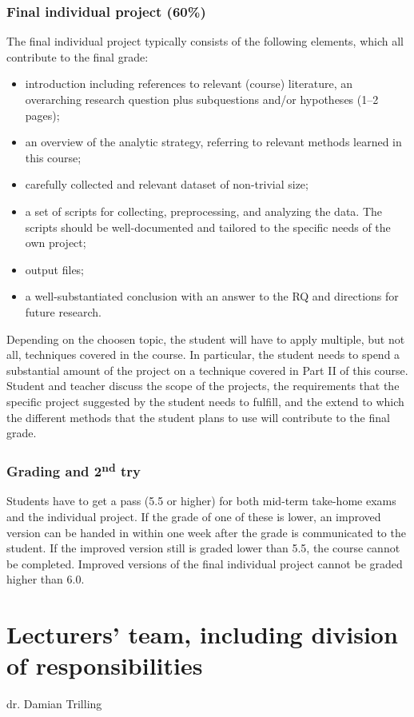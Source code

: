 \documentclass[a4paper,12pt]{report}
\begin{document}
\subsection*{Final individual project (60\%)}
The final individual project typically consists of the following elements, which all contribute to the final grade:
\begin{itemize}
\item introduction including references to relevant (course) literature, an overarching research question plus subquestions and/or hypotheses (1–2 pages);
\item an overview of the analytic strategy, referring to relevant methods learned in this course;
\item carefully collected and relevant dataset of non-trivial size;
\item a set of scripts for collecting, preprocessing, and analyzing the data. The scripts should be well-documented and tailored to the specific needs of the own project;
\item output files;
\item a well-substantiated conclusion with an answer to the RQ and directions for future research.
\end{itemize}

Depending on the choosen topic, the student will have to apply multiple, but not all, techniques covered in the course. In particular, the student needs to spend a substantial amount of the project on a technique covered in Part II of this course. Student and teacher discuss the scope of the projects, the requirements that the specific project suggested by the student needs to fulfill, and the extend to which the different methods that the student plans to use will contribute to the final grade.

\subsection*{Grading and 2\textsuperscript{nd} try}
Students have to get a pass (5.5 or higher) for both mid-term take-home exams and the individual project. If the grade of one of these is lower, an improved version can be handed in within one week after the grade is communicated to the student. If the improved version still is graded lower than 5.5, the course cannot be completed. Improved versions of the final individual project cannot be graded higher than 6.0. 


\chapter{Lecturers' team, including division of responsibilities}
dr. Damian Trilling
\end{document}
